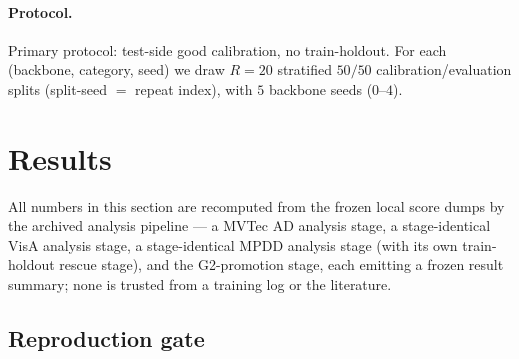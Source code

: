 \documentclass[11pt]{article}
\begin{document}
\paragraph{Protocol.} Primary protocol: test-side good calibration, no
train-holdout. For each (backbone, category, seed) we draw $R=20$ stratified $50/50$
calibration/evaluation splits (split-seed $=$ repeat index), with $5$ backbone seeds ($0$--$4$).

\section{Results}
\label{sec:results}

All numbers in this section are recomputed from the frozen local score dumps by the archived
analysis pipeline --- a MVTec AD analysis stage, a stage-identical VisA analysis stage, a
stage-identical MPDD analysis stage (with its own train-holdout rescue stage), and the
G2-promotion stage, each emitting a frozen result summary; none is trusted from a training log or
the literature.

\subsection{Reproduction gate}
\label{sec:repro}
\end{document}
